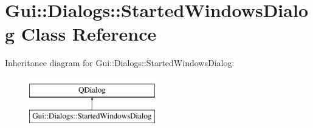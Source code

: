 \hypertarget{classGui_1_1Dialogs_1_1StartedWindowsDialog}{\section{Gui\-:\-:Dialogs\-:\-:Started\-Windows\-Dialog Class Reference}
\label{classGui_1_1Dialogs_1_1StartedWindowsDialog}
}
Inheritance diagram for Gui\-:\-:Dialogs\-:\-:Started\-Windows\-Dialog\-:\begin{figure}[H]
\begin{center}
\leavevmode
\includegraphics[height=2.000000cm]{de/de1/classGui_1_1Dialogs_1_1StartedWindowsDialog}
\end{center}
\end{figure}
